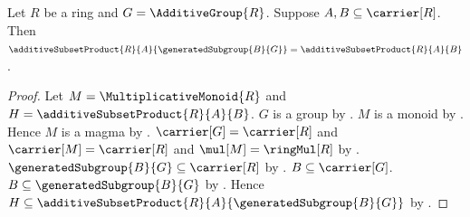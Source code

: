 \begin{theorem}\label{additive_subset_product_generated_right}
    Let $R$ be a ring and $G=\AdditiveGroup{R}$.
    Suppose $A,B\subseteq\carrier[R]$.
    Then
        $\additiveSubsetProduct{R}{A}{\generatedSubgroup{B}{G}}
            =\additiveSubsetProduct{R}{A}{B}$.
\end{theorem}
\begin{proof}
    Let $M=\MultiplicativeMonoid{R}$ and
        $H=\additiveSubsetProduct{R}{A}{B}$.
    $G$ is a group by .
    $M$ is a monoid by .
    Hence $M$ is a magma by .
    $\carrier[G]=\carrier[R]$ and $\carrier[M]=\carrier[R]$ and
        $\mul[M]=\ringMul[R]$ by
        .
    $\generatedSubgroup{B}{G}\subseteq\carrier[R]$ by
        .
    $B\subseteq\carrier[G]$.
    $B\subseteq\generatedSubgroup{B}{G}$ by
        .
    Hence $H\subseteq
        \additiveSubsetProduct{R}{A}{\generatedSubgroup{B}{G}}$ by
        .


\end{proof}
